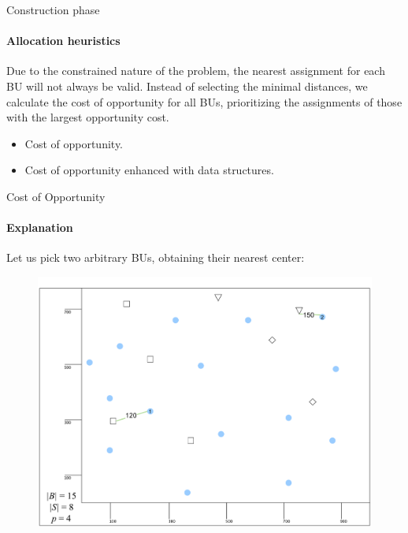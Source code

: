 \documentclass{beamer}
\begin{document}
\begin{frame}{Construction phase}
    \framesubtitle{Allocation heuristics}
    Due to the constrained nature of the problem, the nearest assignment for each BU will not always be valid. Instead of selecting the minimal distances, we calculate the cost of opportunity for all BUs, prioritizing the assignments of those with the largest opportunity cost.
    \begin{itemize}
        \item Cost of opportunity.
        \item Cost of opportunity enhanced with data structures.
    \end{itemize}
    
\end{frame}

\begin{frame}{Cost of Opportunity}
    \framesubtitle{Explanation}
    Let us pick two arbitrary BUs, obtaining their nearest center:
    \begin{figure}
        \centering
        \includegraphics[scale=0.076]{images/opp_1.pdf}
    \end{figure}
\end{frame}
\end{document}
